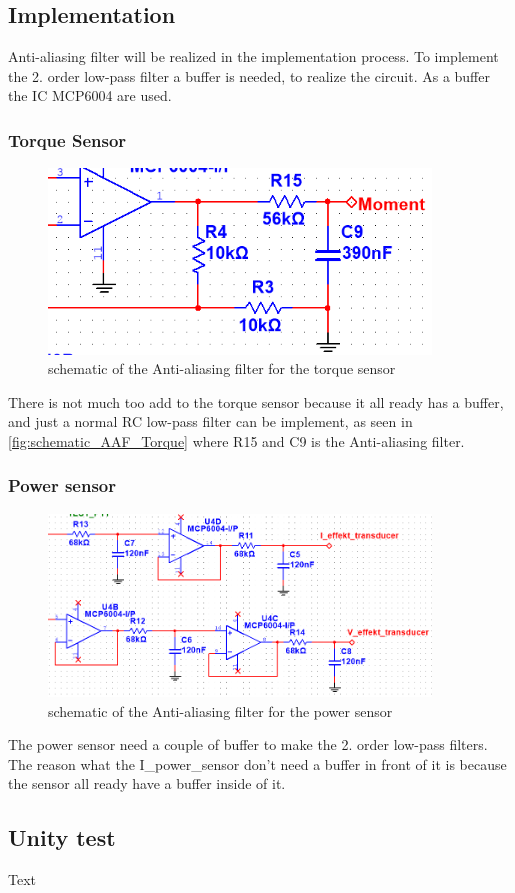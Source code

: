 \subsection{Implementation}

Anti-aliasing filter will be realized in the implementation process. To implement the 2. order low-pass filter a buffer is needed, to realize the circuit. As a buffer the IC MCP6004 are used.
	
\subsubsection*{Torque Sensor}
	
\begin{figure}[H]
	\centering
	\includegraphics [width=4in]{Hardware/Pictures/AAF_moment.PNG}
	\caption{schematic of the Anti-aliasing filter for the torque sensor}
	\label{fig:schematic_AAF_Torque}
\end{figure}
	
There is not much too add to the torque sensor because it all ready has a buffer, and just a normal RC low-pass filter can be implement, as seen in \vref{fig:schematic_AAF_Torque} where R15 and C9 is the Anti-aliasing filter.
	
\subsubsection*{Power sensor}

\begin{figure}[H]
	\centering
	\includegraphics [width=4in]{Hardware/Pictures/AAF_effekt.PNG}
	\caption{schematic of the Anti-aliasing filter for the power sensor}
	\label{fig:schematic_AAF_power}
\end{figure}
	
The power sensor need a couple of buffer to make the 2. order low-pass filters. The reason what the I\_power\_sensor don't need a buffer in front of it is because the sensor all ready have a buffer inside of it.   

\subsection{Unity test}
Text 